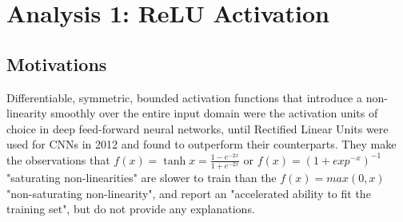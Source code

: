 \documentclass[a4paper,11pt]{article}
\begin{document}
\clearpage

\section{Analysis 1: ReLU Activation}

\subsection{Motivations}

Differentiable, symmetric, bounded activation functions that introduce a non-linearity smoothly over the entire input domain were the activation units of choice in deep feed-forward neural networks, until Rectified Linear Units were used for CNNs in 2012 \cite{krizhevsky} and found to outperform their counterparts. They make the observations that $f(x) = \tanh x = \frac{1 - e^{-2x}}{1 + e^{-2x}}$ or $f(x) = (1+ exp^{-x})^{-1}$ "saturating non-linearities" are slower to train than the $f(x) = max(0,x)$ "non-saturating non-linearity", and report an "accelerated ability to fit the training set", but do not provide any explanations.   \\
\end{document}

